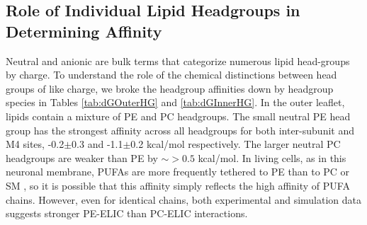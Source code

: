 \documentclass[%
 aip,
 amsmath,amssymb,
 preprint,%
]{revtex4-1}\usepackage{setspace}
\newcommand{\nachr}{nAChR}
\begin{document}
\subsection{Role of Individual Lipid Headgroups in Determining Affinity}
Neutral and anionic are bulk terms that categorize numerous lipid head-groups by charge. %
To understand the role of the chemical distinctions between head groups of like charge, we broke the headgroup affinities down by headgroup species in Tables \ref{tab:dGOuterHG} and \ref{tab:dGInnerHG}.  %
In the outer leaflet, lipids contain a mixture of PE and PC headgroups. The small neutral PE head group has the strongest affinity across all headgroups for both inter-subunit and M4 sites, -0.2$\pm$0.3 and -1.1$\pm$0.2 kcal/mol respectively. The larger neutral PC headgroups are weaker than PE by $\sim > 0.5$ kcal/mol. In living cells, as in this neuronal membrane, PUFAs are more frequently tethered to PE than to PC or SM \cite{Isolated1969, Taguchi2010, Breckenridge1973,Ingolfsson2017b,Lorent2020}, so it is possible that this affinity simply reflects the high affinity of PUFA chains. However, even for identical chains, both experimental and simulation data \cite{Sharp2019} suggests stronger PE-ELIC than PC-ELIC interactions.  
\end{document}
